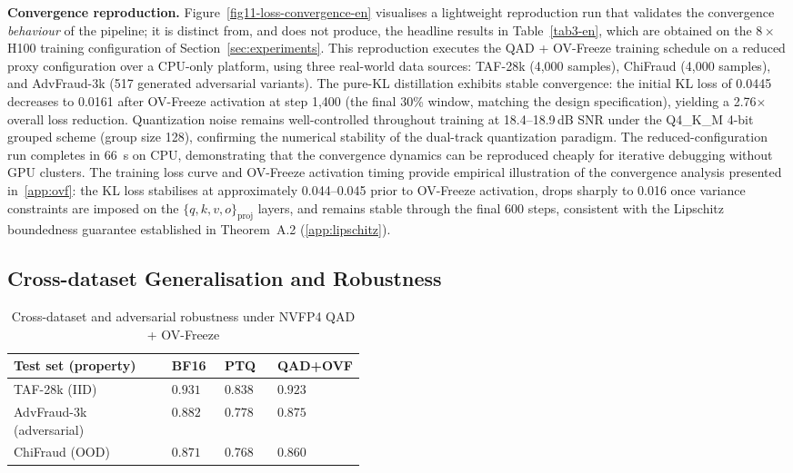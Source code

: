 \documentclass[final,5p,times,number]{elsarticle}
\begin{document}
\medskip
\noindent\textbf{Convergence reproduction.}
Figure~\ref{fig11-loss-convergence-en} visualises a lightweight reproduction run that validates the convergence \emph{behaviour} of the pipeline; it is distinct from, and does not produce, the headline results in Table~\ref{tab3-en}, which are obtained on the $8\times$H100 training configuration of Section~\ref{sec:experiments}. This reproduction executes the QAD + OV-Freeze training schedule on a reduced proxy configuration over a CPU-only platform, using three real-world data sources: TAF-28k (4{,}000 samples), ChiFraud (4{,}000 samples), and AdvFraud-3k (517 generated adversarial variants). The pure-KL distillation exhibits stable convergence: the initial KL loss of 0.0445 decreases to 0.0161 after OV-Freeze activation at step 1{,}400 (the final 30\% window, matching the design specification), yielding a 2.76$\times$ overall loss reduction. Quantization noise remains well-controlled throughout training at 18.4--18.9\,dB SNR under the Q4\_K\_M 4-bit grouped scheme (group size 128), confirming the numerical stability of the dual-track quantization paradigm. The reduced-configuration run completes in 66~s on CPU, demonstrating that the convergence dynamics can be reproduced cheaply for iterative debugging without GPU clusters. The training loss curve and OV-Freeze activation timing provide empirical illustration of the convergence analysis presented in~\ref{app:ovf}: the KL loss stabilises at approximately 0.044--0.045 prior to OV-Freeze activation, drops sharply to 0.016 once variance constraints are imposed on the $\{q,k,v,o\}_{\mathrm{proj}}$ layers, and remains stable through the final 600 steps, consistent with the Lipschitz boundedness guarantee established in Theorem~A.2 (\ref{app:lipschitz}).

\subsection{Cross-dataset Generalisation and Robustness}\label{sec:crossdata}

\begin{table}[!t]
\centering
\caption{Cross-dataset and adversarial robustness under NVFP4 QAD + OV-Freeze}
\label{tab4-cross-en}
\small
\renewcommand{\arraystretch}{1.15}
\begin{tabular}{l>{\centering\arraybackslash}p{0.15\linewidth}>{\centering\arraybackslash}p{0.15\linewidth}>{\centering\arraybackslash}p{0.15\linewidth}}
\toprule
\textbf{Test set (property)} & \textbf{BF16} & \textbf{PTQ} & \textbf{QAD+OVF} \\
\midrule
TAF-28k (IID) & $0.931$ & $0.838$ & $\mathbf{0.923}$ \\
AdvFraud-3k (adversarial) & $0.882$ & $0.778$ & $\mathbf{0.875}$ \\
ChiFraud (OOD) & $0.871$ & $0.768$ & $\mathbf{0.860}$ \\
\bottomrule
\end{tabular}
\end{table}
\end{document}
